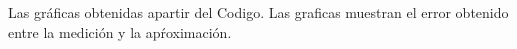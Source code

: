 Las gráficas obtenidas apartir del Codigo. Las graficas muestran el error obtenido entre la medición y la apŕoximación.\\

\begin{figure}[htb]
\end{figure}



